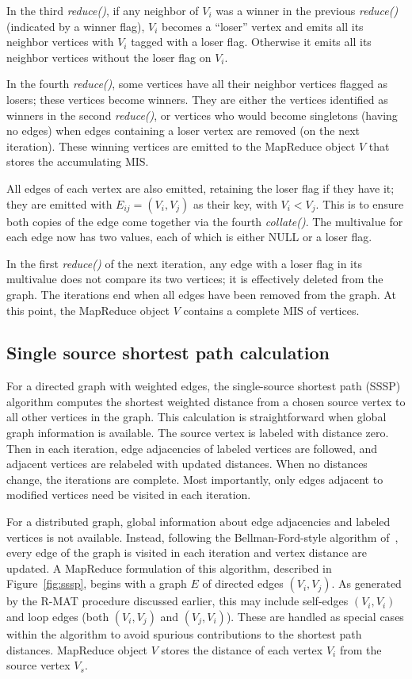 In the third {\it reduce()}, if any neighbor of $V_i$ was a winner in
the previous {\it reduce()} (indicated by a winner flag), $V_i$
becomes a ``loser'' vertex and emits all its neighbor vertices with
$V_i$ tagged with a loser flag.  Otherwise it emits all its neighbor
vertices without the loser flag on $V_i$.

In the fourth {\it reduce()}, some vertices have all their neighbor
vertices flagged as losers; these vertices become winners.  They are
either the vertices identified as winners in the second {\it
reduce()}, or vertices who would become singletons (having no edges)
when edges containing a loser vertex are removed (on the next
iteration).  These winning vertices are emitted to the MapReduce
object $V$ that stores the accumulating MIS.

All edges of each vertex are also emitted, retaining the loser flag if
they have it; they are emitted with $E_{ij} = (V_i, V_j)$ as their
key, with $V_i < V_j$.  This is to ensure both copies of the edge come
together via the fourth {\it collate()}.  The multivalue for each edge
now has two values, each of which is either NULL or a loser flag.

In the first {\it reduce()} of the next iteration, any edge with a
loser flag in its multivalue does not compare its two vertices; it is
effectively deleted from the graph.  The iterations end when all edges
have been removed from the graph.  At this point, the MapReduce object
$V$ contains a complete MIS of vertices.

\subsection{Single source shortest path calculation}

For a directed graph with weighted edges, the single-source shortest
path (SSSP) algorithm computes the shortest weighted distance from a
chosen source vertex to all other vertices in the graph.  This
calculation is straightforward when global graph information is
available.  The source vertex is labeled with distance zero.  Then in
each iteration, edge adjacencies of labeled vertices are followed, and
adjacent vertices are relabeled with updated distances.  When no
distances change, the iterations are complete.  Most importantly, only
edges adjacent to modified vertices need be visited in each iteration.

For a distributed graph, global information about edge adjacencies and
labeled vertices is not available.  Instead, following the
Bellman-Ford-style algorithm of~\cite{SSSPMapReduce, Bellman58,
Ford62}, every edge of the graph is visited in each iteration and
vertex distance are updated.  A MapReduce formulation of this
algorithm, described in Figure~\ref{fig:sssp}, begins with a graph $E$
of directed edges $(V_i,V_j)$.  As generated by the R-MAT procedure
discussed earlier, this may include self-edges $(V_i,V_i)$ and loop
edges (both $(V_i,V_j)$ and $(V_j,V_i)$).  These are handled as
special cases within the algorithm to avoid spurious contributions to
the shortest path distances.  MapReduce object $V$ stores the distance
of each vertex $V_i$ from the source vertex $V_s$.

